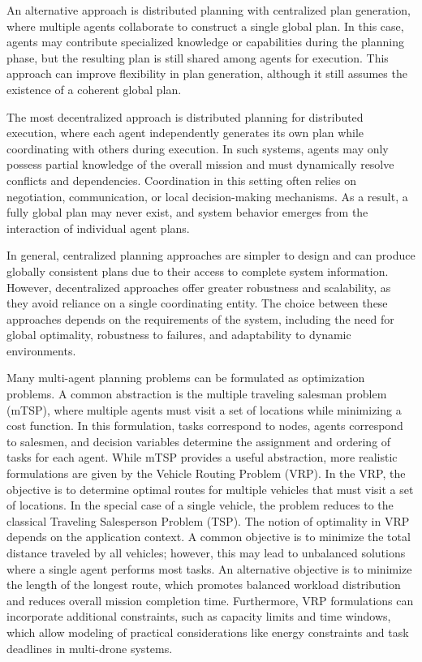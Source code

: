 An alternative approach is distributed planning with centralized plan generation, where multiple agents collaborate to construct a single global plan. 
In this case, agents may contribute specialized knowledge or capabilities during the planning phase, but the resulting plan is still shared among agents for execution. 
This approach can improve flexibility in plan generation, although it still assumes the existence of a coherent global plan.

The most decentralized approach is distributed planning for distributed execution, 
where each agent independently generates its own plan while coordinating with others during execution. 
In such systems, agents may only possess partial knowledge of the overall mission and must dynamically resolve conflicts and dependencies. 
Coordination in this setting often relies on negotiation, communication, or local decision-making mechanisms. 
As a result, a fully global plan may never exist, and system behavior emerges from the interaction of individual agent plans.

In general, centralized planning approaches are simpler to design and can produce globally consistent plans due to their access to complete system information. 
However, decentralized approaches offer greater robustness and scalability, as they avoid reliance on a single coordinating entity. 
The choice between these approaches depends on the requirements of the system, including the need for global optimality, robustness to failures, 
and adaptability to dynamic environments.

Many multi-agent planning problems can be formulated as optimization problems. 
A common abstraction is the multiple traveling salesman problem (mTSP), where multiple agents must visit a set of locations while minimizing a cost function. 
In this formulation, tasks correspond to nodes, agents correspond to salesmen, and decision variables determine the assignment and ordering of tasks for each agent.
While mTSP provides a useful abstraction, more realistic formulations are given by the Vehicle Routing Problem (VRP). 
In the VRP, the objective is to determine optimal routes for multiple vehicles that must visit a set of locations. 
In the special case of a single vehicle, the problem reduces to the classical Traveling Salesperson Problem (TSP).
The notion of optimality in VRP depends on the application context. 
A common objective is to minimize the total distance traveled by all vehicles; however, this may lead to unbalanced solutions where a single agent performs most tasks. 
An alternative objective is to minimize the length of the longest route, 
which promotes balanced workload distribution and reduces overall mission completion time. 
Furthermore, VRP formulations can incorporate additional constraints, 
such as capacity limits and time windows, which allow modeling of practical considerations like energy constraints and task deadlines in multi-drone systems.

